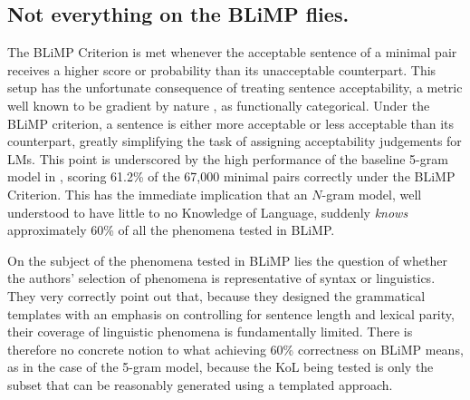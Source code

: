 \subsection{Not everything on the BLiMP flies.}
The BLiMP Criterion is met whenever the acceptable sentence of a minimal pair receives a higher score or probability than its unacceptable counterpart.  This setup has the unfortunate consequence of treating sentence acceptability, a metric well known to be gradient by nature \citep{sprouse2018colorless}, as functionally categorical.  Under the BLiMP criterion, a sentence is either more acceptable or less acceptable than its counterpart, greatly simplifying the task of assigning acceptability judgements for LMs.  This point is underscored by the high performance of the baseline 5-gram model in \citet{warstadt2019blimp}, scoring 61.2\% of the 67,000 minimal pairs correctly under the BLiMP Criterion.  This has the immediate implication that an $N$-gram model, well understood to have little to no Knowledge of Language, suddenly \textit{knows} approximately 60\% of all the phenomena tested in BLiMP.

On the subject of the phenomena tested in BLiMP lies the question of whether the authors' selection of phenomena is representative of syntax or linguistics.  They very correctly point out that, because they designed the grammatical templates with an emphasis on controlling for sentence length and lexical parity, their coverage of linguistic phenomena is fundamentally limited.  There is therefore no concrete notion to what achieving 60\% correctness on BLiMP means, as in the case of the 5-gram model, because the KoL being tested is only the subset that can be reasonably generated using a templated approach.  

